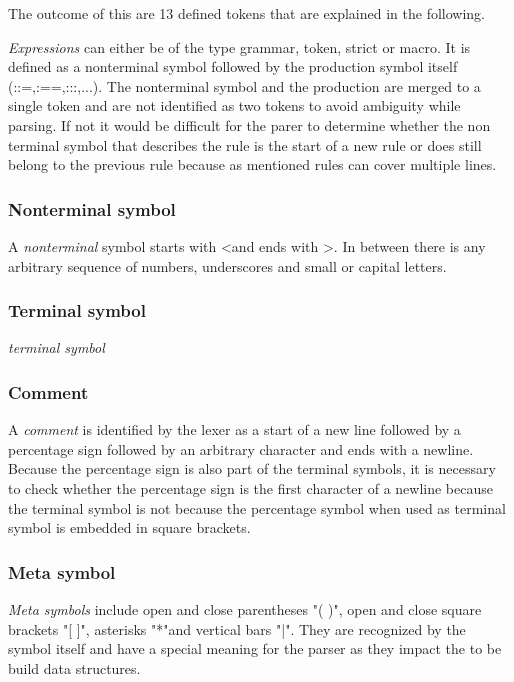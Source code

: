  



The outcome of this are 13 defined tokens that are explained in the following.

\textit{Expressions} can either be of the type grammar, token, strict or macro. 
It is defined as a nonterminal symbol followed by the production symbol itself (::=,:==,:::,...). 
The nonterminal symbol and the production are merged to a single token and are not identified as two
tokens to avoid ambiguity while parsing.
If not it would be difficult for the parer to determine whether the non terminal symbol that describes the rule is the start of a new rule or does still belong to the previous rule because as mentioned rules can cover multiple lines.

\subsubsection{Nonterminal symbol}
A \textit{nonterminal} symbol starts with \textless and ends with \textgreater . In between there is any
arbitrary sequence of numbers, underscores and small or capital letters.

\subsubsection{Terminal symbol}
\textit{terminal symbol}

\subsubsection{Comment}
A \textit{comment} is identified by the lexer as a start of a new line followed by a percentage
sign followed by an arbitrary character and ends with a newline.
Because the
percentage sign is also part of the terminal symbols, it is necessary to check whether
the percentage sign is the first character of a newline because the terminal symbol is not because the
percentage symbol when used as terminal symbol is embedded in square brackets.

\subsubsection{Meta symbol}
\textit{Meta symbols} include open and close parentheses "( )", open and close square
brackets "[ ]", asterisks "*"and vertical bars "|".
They are recognized by the symbol itself and have a special meaning for the parser as they impact the to be build data structures.

